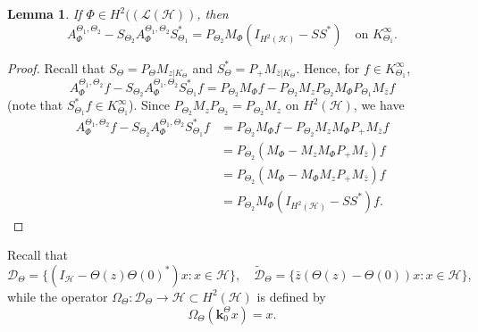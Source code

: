 \documentclass[11pt]{amsart}
\numberwithin{equation}{section}
\newcommand{\hsp}{\mathcal{H}}
\newcommand{\ke}{{\mathbf{k}}}
\newtheorem{lemma}[theorem]{Lemma}
\theoremstyle{definition}
\numberwithin{equation}{section}
\begin{document}
\begin{lemma}\label{10}
	If $\Phi\in H^2((\mathcal{L}(\hsp))$, then
	 $$A_\Phi^{{\Theta_1},{\Theta_2}}-S_{\Theta_2}A_\Phi^{{\Theta_1},{\Theta_2}}S_{\Theta_1}^*=P_{\Theta_2}M_{\Phi}(I_{H^2(\hsp)}-SS^*)\quad\text{on }K_{\Theta_1}^{\infty}.$$
\end{lemma}
\begin{proof}
	Recall that  $S_{\Theta}=P_{\Theta}M_{z|K_{\Theta}}$ and $S_{\Theta}^*=P_+M_{\bar z|K_{\Theta}}$. Hence, for $f\in K_{\Theta_1}^{\infty}$,	
	 $$A_\Phi^{{\Theta_1},{\Theta_2}}f-S_{\Theta_2}A_\Phi^{{\Theta_1},{\Theta_2}}S_{\Theta_1}^*f=P_{\Theta_2}M_{\Phi}f-P_{\Theta_2}M_{z}P_{\Theta_2}M_{\Phi}P_{\Theta_1}M_{\bar z}f$$
	(note that $S_{\Theta_1}^*f\in K_{\Theta_1}^{\infty}$). Since $P_{\Theta_2} M_zP_{\Theta_2}=P_{\Theta_2} M_z$ on $H^2(\hsp)$, we have
	\begin{align*}
		 A_\Phi^{{\Theta_1},{\Theta_2}}f-S_{\Theta_2}A_\Phi^{{\Theta_1},{\Theta_2}}S_{\Theta_1}^*f&=P_{\Theta_2}M_{\Phi}f-P_{\Theta_2}M_{z}M_{\Phi}P_+M_{\bar z}f \\
		&=P_{\Theta_2}(M_{\Phi}-M_{z}M_{\Phi}P_+M_{\bar z})f\\
		&=P_{\Theta_2}(M_{\Phi}-M_{\Phi}M_{z}P_+M_{\bar z})f\\
		&=P_{\Theta_2}M_{\Phi}(I_{H^2(\hsp)}-SS^*)f.
	\end{align*}
\end{proof}

Recall that
$$\mathcal{D}_{\Theta}=\{ (I_{\hsp}-\Theta(z)\Theta(0)^*)x : x\in \hsp\},\quad \widetilde{\mathcal{D}}_{\Theta}=\{ \bar{z}(\Theta(z)-\Theta(0))x: x\in \hsp \},$$
while the operator $\Omega_{\Theta}:\mathcal{D}_{\Theta}\rightarrow \hsp\subset H^2(\hsp)$ is defined by  $$\Omega_{\Theta}(\ke_0^{\Theta}x)=x.$$
\end{document}

